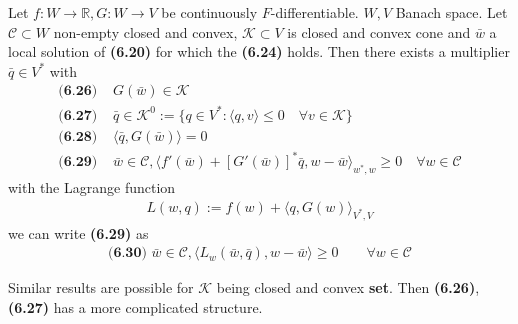 \begin{theorem}
	Let $f: W \rightarrow \mathbb{R}, G: W \rightarrow V$ be continuously $F$-differentiable. $W, V$ Banach space. Let $\mathcal{C} \subset W$ non-empty closed and convex, $\mathcal{K} \subset V$ is closed and convex cone and $\bar{w}$ a local solution of \textbf{(6.20)} for which the \textbf{(6.24)} holds. Then there exists a multiplier $\bar{q} \in V^*$ with 
	\begin{align*}
		\textbf{(6.26) } &G(\bar{w}) \in \mathcal{K}\\
		\textbf{(6.27) } &\bar{q} \in \mathcal{K}^0:= \{q \in V^*: \langle q, v \rangle \le 0 \quad \forall v \in \mathcal{K} \}\\
		\textbf{(6.28) } &\langle \bar{q}, G(\bar{w}) \rangle = 0\\
		\textbf{(6.29) } &\bar{w} \in \mathcal{C}, \langle f'(\bar{w}) + [G'(\bar{w})]^* \bar{q}, w - \bar{w} \rangle_{w^*, w} \geq 0 \quad \forall w \in \mathcal{C}
	\end{align*}
	with the Lagrange function
	\begin{align*}
		L(w, q):= f(w) + \langle q, G(w) \rangle_{V^*, V}
	\end{align*}
	we can write \textbf{(6.29)} as 
	\begin{align*}
		\textbf{(6.30) }
		\bar{w} \in \mathcal{C}, \langle L_w(\bar{w}, \bar{q}), w - \bar{w} \rangle \ge 0\qquad \forall w \in \mathcal{C}
	\end{align*}
\end{theorem}

Similar results are possible for $\mathcal{K}$ being closed and convex \textbf{set}. Then \textbf{(6.26)}, \textbf{(6.27)} has a more complicated structure. 


